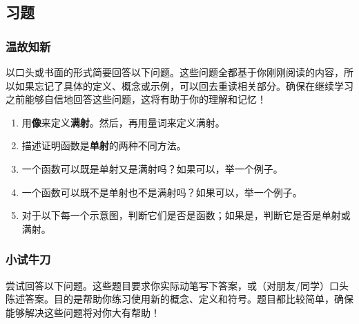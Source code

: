 
\subsection{习题}\label{sec:section7.4.5}

\subsubsection*{温故知新}

以口头或书面的形式简要回答以下问题。这些问题全都基于你刚刚阅读的内容，所以如果忘记了具体的定义、概念或示例，可以回去重读相关部分。确保在继续学习之前能够自信地回答这些问题，这将有助于你的理解和记忆！

\begin{enumerate}[label=(\arabic*)]
    \item 用\textbf{像}来定义\textbf{满射}。然后，再用量词来定义满射。
    \item 描述证明函数是\textbf{单射}的两种不同方法。
    \item 一个函数可以既是单射又是满射吗？如果可以，举一个例子。
    \item 一个函数可以既不是单射也不是满射吗？如果可以，举一个例子。
    \item 对于以下每一个示意图，判断它们是否是函数；如果是，判断它是否是单射或满射。
\end{enumerate}

\subsubsection*{小试牛刀}

尝试回答以下问题。这些题目要求你实际动笔写下答案，或（对朋友/同学）口头陈述答案。目的是帮助你练习使用新的概念、定义和符号。题目都比较简单，确保能够解决这些问题将对你大有帮助！

